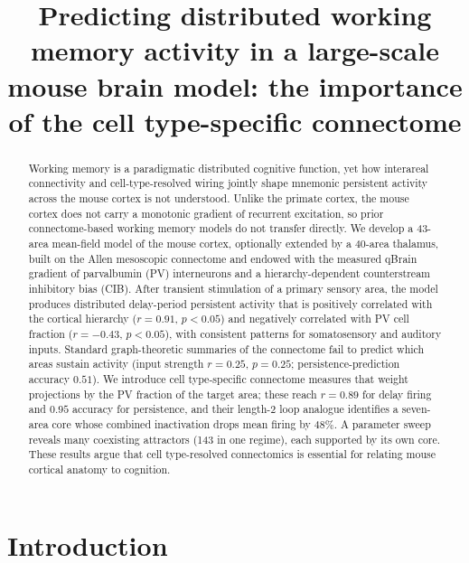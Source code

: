 \documentclass[11pt]{article}
\title{Predicting distributed working memory activity in a large-scale mouse brain model: the importance of the cell type-specific connectome}
\author{}
\date{}
\begin{document}
\maketitle

\begin{abstract}
Working memory is a paradigmatic distributed cognitive function, yet how interareal connectivity and cell-type-resolved wiring jointly shape mnemonic persistent activity across the mouse cortex is not understood. Unlike the primate cortex, the mouse cortex does not carry a monotonic gradient of recurrent excitation, so prior connectome-based working memory models do not transfer directly. We develop a 43-area mean-field model of the mouse cortex, optionally extended by a 40-area thalamus, built on the Allen mesoscopic connectome and endowed with the measured qBrain gradient of parvalbumin (PV) interneurons and a hierarchy-dependent counterstream inhibitory bias (CIB). After transient stimulation of a primary sensory area, the model produces distributed delay-period persistent activity that is positively correlated with the cortical hierarchy ($r=0.91$, $p<0.05$) and negatively correlated with PV cell fraction ($r=-0.43$, $p<0.05$), with consistent patterns for somatosensory and auditory inputs. Standard graph-theoretic summaries of the connectome fail to predict which areas sustain activity (input strength $r=0.25$, $p=0.25$; persistence-prediction accuracy $0.51$). We introduce cell type-specific connectome measures that weight projections by the PV fraction of the target area; these reach $r=0.89$ for delay firing and $0.95$ accuracy for persistence, and their length-2 loop analogue identifies a seven-area core whose combined inactivation drops mean firing by $48\%$. A parameter sweep reveals many coexisting attractors (143 in one regime), each supported by its own core. These results argue that cell type-resolved connectomics is essential for relating mouse cortical anatomy to cognition.
\end{abstract}

\section{Introduction}
\end{document}
